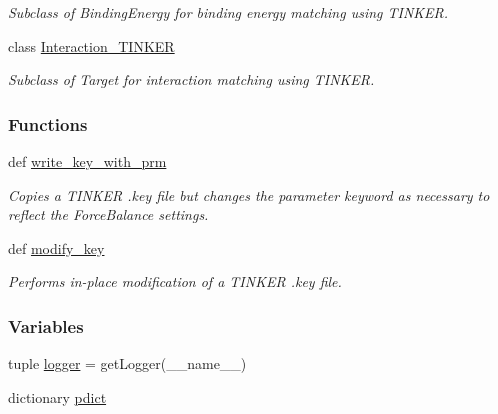 \begin{DoxyCompactItemize}
\begin{DoxyCompactList}\small\item\em \-Subclass of \-Binding\-Energy for binding energy matching using \-T\-I\-N\-K\-E\-R. \end{DoxyCompactList}\item 
class \hyperlink{classforcebalance_1_1tinkerio_1_1Interaction__TINKER}{\-Interaction\-\_\-\-T\-I\-N\-K\-E\-R}
\begin{DoxyCompactList}\small\item\em \-Subclass of \-Target for interaction matching using \-T\-I\-N\-K\-E\-R. \end{DoxyCompactList}\end{DoxyCompactItemize}
\subsubsection*{\-Functions}
\begin{DoxyCompactItemize}
\item 
def \hyperlink{namespaceforcebalance_1_1tinkerio_a9cde7bd64c6f5286c1f33a39211d5a11}{write\-\_\-key\-\_\-with\-\_\-prm}
\begin{DoxyCompactList}\small\item\em \-Copies a \-T\-I\-N\-K\-E\-R .key file but changes the parameter keyword as necessary to reflect the \-Force\-Balance settings. \end{DoxyCompactList}\item 
def \hyperlink{namespaceforcebalance_1_1tinkerio_aa82c424420ad59b6a78b273d6c1fd469}{modify\-\_\-key}
\begin{DoxyCompactList}\small\item\em \-Performs in-\/place modification of a \-T\-I\-N\-K\-E\-R .key file. \end{DoxyCompactList}\end{DoxyCompactItemize}
\subsubsection*{\-Variables}
\begin{DoxyCompactItemize}
\item 
tuple \hyperlink{namespaceforcebalance_1_1tinkerio_a2213c6a64efe42ee845dad485eee582e}{logger} = get\-Logger(\-\_\-\-\_\-name\-\_\-\-\_\-)
\item 
dictionary \hyperlink{namespaceforcebalance_1_1tinkerio_a37b5a9c337cd2791f6d6c00bf295e69c}{pdict}
\end{DoxyCompactItemize}


